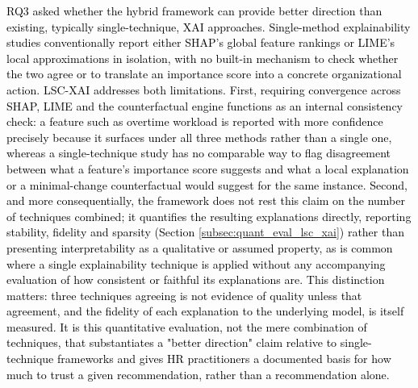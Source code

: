 \documentclass[a4paper,fleqn]{cas-sc}
\begin{document}
{\textcolor{black}{RQ3 asked whether the hybrid framework can provide better direction than existing, typically single-technique, XAI approaches. Single-method explainability studies conventionally report either SHAP's global feature rankings or LIME's local approximations in isolation, with no built-in mechanism to check whether the two agree or to translate an importance score into a concrete organizational action. LSC-XAI addresses both limitations. First, requiring convergence across SHAP, LIME and the counterfactual engine functions as an internal consistency check: a feature such as overtime workload is reported with more confidence precisely because it surfaces under all three methods rather than a single one, whereas a single-technique study has no comparable way to flag disagreement between what a feature's importance score suggests and what a local explanation or a minimal-change counterfactual would suggest for the same instance. Second, and more consequentially, the framework does not rest this claim on the number of techniques combined; it quantifies the resulting explanations directly, reporting stability, fidelity and sparsity (Section \ref{subsec:quant_eval_lsc_xai}) rather than presenting interpretability as a qualitative or assumed property, as is common where a single explainability technique is applied without any accompanying evaluation of how consistent or faithful its explanations are. This distinction matters: three techniques agreeing is not evidence of quality unless that agreement, and the fidelity of each explanation to the underlying model, is itself measured. It is this quantitative evaluation, not the mere combination of techniques, that substantiates a "better direction" claim relative to single-technique frameworks and gives HR practitioners a documented basis for how much to trust a given recommendation, rather than a recommendation alone.}

}
\end{document}
